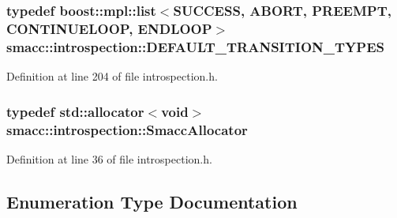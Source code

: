 \subsubsection[{\texorpdfstring{D\+E\+F\+A\+U\+L\+T\+\_\+\+T\+R\+A\+N\+S\+I\+T\+I\+O\+N\+\_\+\+T\+Y\+P\+ES}{DEFAULT_TRANSITION_TYPES}}]{\setlength{\rightskip}{0pt plus 5cm}typedef boost\+::mpl\+::list$<${\bf S\+U\+C\+C\+E\+SS}, {\bf A\+B\+O\+RT}, {\bf P\+R\+E\+E\+M\+PT}, {\bf C\+O\+N\+T\+I\+N\+U\+E\+L\+O\+OP}, {\bf E\+N\+D\+L\+O\+OP}$>$ {\bf smacc\+::introspection\+::\+D\+E\+F\+A\+U\+L\+T\+\_\+\+T\+R\+A\+N\+S\+I\+T\+I\+O\+N\+\_\+\+T\+Y\+P\+ES}}\hypertarget{namespacesmacc_1_1introspection_ac678f3918f2036c45d7d0da7f5afce83}{}\label{namespacesmacc_1_1introspection_ac678f3918f2036c45d7d0da7f5afce83}


Definition at line 204 of file introspection.\+h.

\subsubsection[{\texorpdfstring{Smacc\+Allocator}{SmaccAllocator}}]{\setlength{\rightskip}{0pt plus 5cm}typedef std\+::allocator$<$void$>$ {\bf smacc\+::introspection\+::\+Smacc\+Allocator}}\hypertarget{namespacesmacc_1_1introspection_aa4064aa24887868c6347efc004c08986}{}\label{namespacesmacc_1_1introspection_aa4064aa24887868c6347efc004c08986}


Definition at line 36 of file introspection.\+h.



\subsection{Enumeration Type Documentation}
